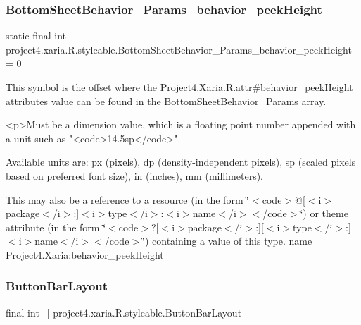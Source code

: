 \subsubsection{\texorpdfstring{Bottom\+Sheet\+Behavior\+\_\+\+Params\+\_\+behavior\+\_\+peek\+Height}{BottomSheetBehavior\_Params\_behavior\_peekHeight}}
{\footnotesize\ttfamily static final int project4.\+xaria.\+R.\+styleable.\+Bottom\+Sheet\+Behavior\+\_\+\+Params\+\_\+behavior\+\_\+peek\+Height = 0\hspace{0.3cm}{\ttfamily [static]}}

This symbol is the offset where the \hyperlink{}{Project4.\+Xaria.\+R.\+attr\#behavior\+\_\+peek\+Height} attribute\textquotesingle{}s value can be found in the \hyperlink{classproject4_1_1xaria_1_1R_1_1styleable_ad80ceca30648e8c60ba2898c9560a573}{Bottom\+Sheet\+Behavior\+\_\+\+Params} array.

\begin{DoxyVerb}      <p>Must be a dimension value, which is a floating point number appended with a unit such as "<code>14.5sp</code>".
\end{DoxyVerb}
 Available units are\+: px (pixels), dp (density-\/independent pixels), sp (scaled pixels based on preferred font size), in (inches), mm (millimeters). 

This may also be a reference to a resource (in the form \char`\"{}$<$code$>$@\mbox{[}$<$i$>$package$<$/i$>$\+:\mbox{]}$<$i$>$type$<$/i$>$\+:$<$i$>$name$<$/i$>$$<$/code$>$\char`\"{}) or theme attribute (in the form \char`\"{}$<$code$>$?\mbox{[}$<$i$>$package$<$/i$>$\+:\mbox{]}\mbox{[}$<$i$>$type$<$/i$>$\+:\mbox{]}$<$i$>$name$<$/i$>$$<$/code$>$\char`\"{}) containing a value of this type.  name Project4.\+Xaria\+:behavior\+\_\+peek\+Height \mbox{\label{classproject4_1_1xaria_1_1R_1_1styleable_ad7c5e25ea8375a04aba691097eab654d}} 
\subsubsection{\texorpdfstring{Button\+Bar\+Layout}{ButtonBarLayout}}
{\footnotesize\ttfamily final int \mbox{[}$\,$\mbox{]} project4.\+xaria.\+R.\+styleable.\+Button\+Bar\+Layout\hspace{0.3cm}{\ttfamily [static]}}

